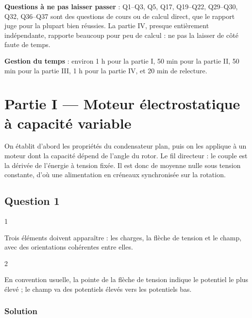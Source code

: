 \documentclass[11pt,a4paper]{article}
\begin{document}
\textbf{Questions à ne pas laisser passer} : Q1--Q3, Q5, Q17, Q19--Q22, Q29--Q30, Q32, Q36--Q37 sont des questions de cours ou de calcul direct, que le rapport juge pour la plupart bien réussies. La partie IV, presque entièrement indépendante, rapporte beaucoup pour peu de calcul : ne pas la laisser de côté faute de temps.

\textbf{Gestion du temps} : environ 1 h pour la partie I, 50 min pour la partie II, 50 min pour la partie III, 1 h pour la partie IV, et 20 min de relecture.

\hypertarget{partie-i-moteur-uxe9lectrostatique-uxe0-capacituxe9-variable}{%
\section{Partie I --- Moteur électrostatique à capacité variable}\label{partie-i-moteur-uxe9lectrostatique-uxe0-capacituxe9-variable}}

On établit d'abord les propriétés du condensateur plan, puis on les applique à un moteur dont la capacité dépend de l'angle du rotor. Le fil directeur : le couple est la dérivée de l'énergie à tension fixée. Il est donc de moyenne nulle sous tension constante, d'où une alimentation en créneaux synchronisée sur la rotation.

\hypertarget{question-1}{%
\subsection{Question 1}\label{question-1}}

\begin{indication}{1}

Trois éléments doivent apparaître : les charges, la flèche de tension et le champ, avec des orientations cohérentes entre elles.

\end{indication}

\begin{indication}{2}

En convention usuelle, la pointe de la flèche de tension indique le potentiel le plus élevé ; le champ va des potentiels élevés vers les potentiels bas.

\end{indication}

\hypertarget{solution}{%
\subsubsection{Solution}\label{solution}}
\end{document}
